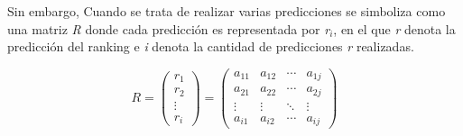 Sin embargo, Cuando se trata de realizar varias predicciones se simboliza como una matriz \textit{R} donde cada predicción es representada por \textit{r$_{i}$}, en el que \textit{r} denota la predicción del ranking  e \textit{i} denota la cantidad de predicciones \textit{r} realizadas.
\begin{center}
    \[  \textit{R} = 
        \begin{pmatrix}
            \textit{r$_{1}$}  \\ 
            \textit{r$_{2}$}  \\ 
            \vdots  \\ 
            \textit{r$_{i}$}
        \end{pmatrix} 
        =
        \begin{pmatrix}
            a_{11}  &  a_{12}  &  \cdots   & a_{1j} \\ 
            a_{21}  &  a_{22}  &  \cdots   & a_{2j}\\ 
            \vdots  &  \vdots  &  \ddots & \vdots  \\ 
            a_{i1}  &  a_{i2}  &  \cdots   & a_{ij}
        \end{pmatrix}
    \]
\end{center}
\newpage
